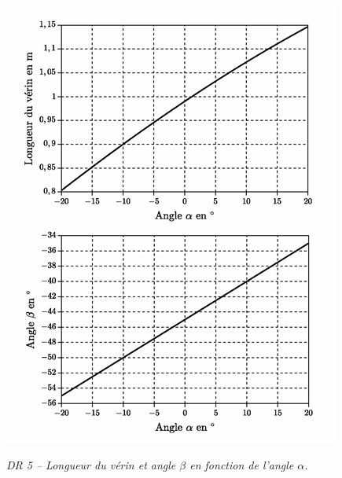 \documentclass[10pt,fleqn]{article} %
\begin{document}
\begin{center}
\includegraphics[width=.9\linewidth]{images/DR_05}

\textit{DR 5 -- Longueur du vérin et angle $\beta$ en fonction de l'angle $\alpha$.}
\end{center}
\end{document}
